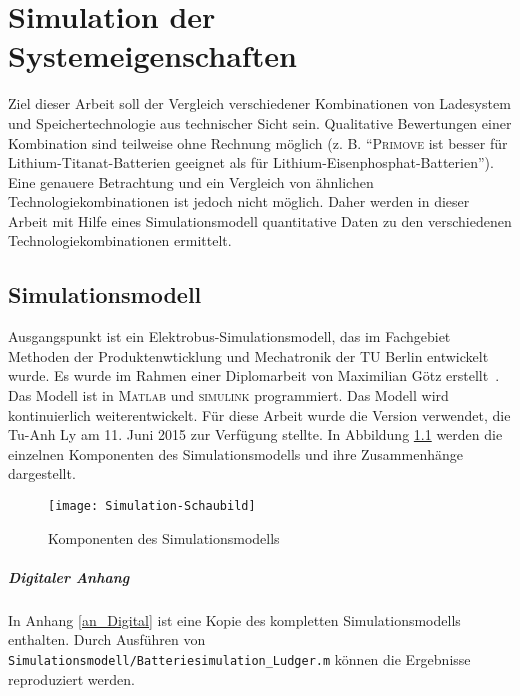 \chapter{Simulation der Systemeigenschaften}
\label{chap4}
Ziel dieser Arbeit soll der Vergleich verschiedener Kombinationen von Ladesystem und Speichertechnologie aus technischer Sicht sein. Qualitative Bewertungen einer Kombination sind teilweise ohne Rechnung möglich (z. B. "`\textsc{Primove} ist besser für Lithium-Titanat-Batterien geeignet als für Lithium-Eisenphosphat-Batterien"'). Eine genauere Betrachtung und ein Vergleich von ähnlichen Technologiekombinationen ist jedoch nicht möglich. Daher werden in dieser Arbeit mit Hilfe eines Simulationsmodell quantitative Daten zu den verschiedenen Technologiekombinationen ermittelt.

\section{Simulationsmodell}
Ausgangspunkt ist ein Elektrobus-Simulationsmodell, das im Fachgebiet Methoden der Produktenwticklung und Mechatronik der TU Berlin entwickelt wurde. Es wurde im Rahmen einer Diplomarbeit von Maximilian Götz erstellt~\cite{Gotz:2013}. Das Modell ist in \textsc{Matlab} und \textsc{simulink} programmiert. Das Modell wird kontinuierlich weiterentwickelt. Für diese Arbeit wurde die Version verwendet, die Tu-Anh Ly am 11. Juni 2015 zur Verfügung stellte. In Abbildung \ref{abb_simmodell} werden die einzelnen Komponenten des Simulationsmodells und ihre Zusammenhänge dargestellt.
\begin{figure}\centering
	\texttt{[image: Simulation-Schaubild]}
	\caption{Komponenten des Simulationsmodells}
	\label{abb_simmodell}
\end{figure}

\paragraph{Digitaler Anhang} In Anhang \ref{an_Digital} ist eine Kopie des kompletten Simulationsmodells enthalten. Durch Ausführen von \texttt{Simulationsmodell/Batteriesimulation\_Ludger.m} können die Ergebnisse reproduziert werden.

